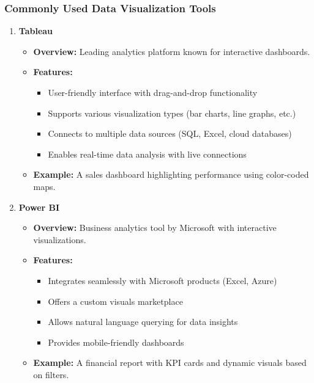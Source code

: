 \documentclass[aspectratio=169]{beamer}
\begin{document}
\begin{frame}[fragile]
    \frametitle{Commonly Used Data Visualization Tools}

    \begin{enumerate}
        \item \textbf{Tableau}
            \begin{itemize}
                \item \textbf{Overview:} Leading analytics platform known for interactive dashboards.
                \item \textbf{Features:}
                    \begin{itemize}
                        \item User-friendly interface with drag-and-drop functionality
                        \item Supports various visualization types (bar charts, line graphs, etc.)
                        \item Connects to multiple data sources (SQL, Excel, cloud databases)
                        \item Enables real-time data analysis with live connections
                    \end{itemize}
                \item \textbf{Example:} A sales dashboard highlighting performance using color-coded maps.
            \end{itemize}

        \item \textbf{Power BI}
            \begin{itemize}
                \item \textbf{Overview:} Business analytics tool by Microsoft with interactive visualizations.
                \item \textbf{Features:}
                    \begin{itemize}
                        \item Integrates seamlessly with Microsoft products (Excel, Azure)
                        \item Offers a custom visuals marketplace
                        \item Allows natural language querying for data insights
                        \item Provides mobile-friendly dashboards
                    \end{itemize}
                \item \textbf{Example:} A financial report with KPI cards and dynamic visuals based on filters.
            \end{itemize}
    \end{enumerate}
\end{frame}
\end{document}
